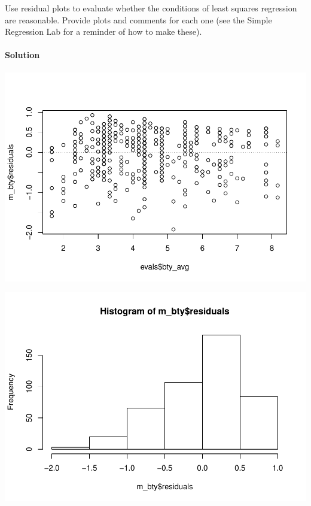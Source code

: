 \documentclass[]{article}
\newenvironment{Shaded}{\begin{snugshade}}{\end{snugshade}}
\newcommand{\KeywordTok}[1]{\textcolor[rgb]{0.13,0.29,0.53}{\textbf{#1}}}
\newcommand{\DataTypeTok}[1]{\textcolor[rgb]{0.13,0.29,0.53}{#1}}
\newcommand{\DecValTok}[1]{\textcolor[rgb]{0.00,0.00,0.81}{#1}}
\newcommand{\StringTok}[1]{\textcolor[rgb]{0.31,0.60,0.02}{#1}}
\newcommand{\OperatorTok}[1]{\textcolor[rgb]{0.81,0.36,0.00}{\textbf{#1}}}
\newcommand{\NormalTok}[1]{#1}
\let\oldparagraph\paragraph
\renewcommand{\paragraph}[1]{\oldparagraph{#1}\mbox{}}
\begin{document}
Use residual plots to evaluate whether the conditions of least squares
regression are reasonable. Provide plots and comments for each one (see
the Simple Regression Lab for a reminder of how to make these).

\paragraph{Solution}\label{solution-5}

\begin{Shaded}
\end{Shaded}

\includegraphics{multiple_regression_files/figure-latex/quest-6-1.pdf}

\begin{Shaded}
\end{Shaded}

\includegraphics{multiple_regression_files/figure-latex/quest-6-2.pdf}
\end{document}
